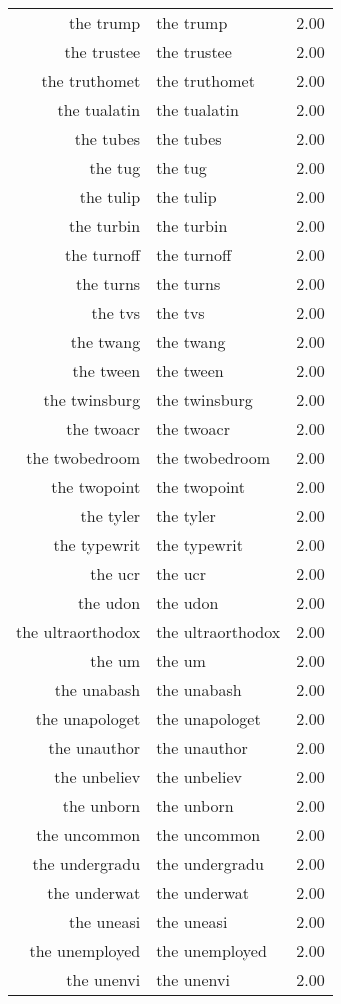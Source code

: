 \begin{table}[ht]
\begin{tabular}{rlr}
  the trump & the trump & 2.00 \\ 
  the trustee & the trustee & 2.00 \\ 
  the truthomet & the truthomet & 2.00 \\ 
  the tualatin & the tualatin & 2.00 \\ 
  the tubes & the tubes & 2.00 \\ 
  the tug & the tug & 2.00 \\ 
  the tulip & the tulip & 2.00 \\ 
  the turbin & the turbin & 2.00 \\ 
  the turnoff & the turnoff & 2.00 \\ 
  the turns & the turns & 2.00 \\ 
  the tvs & the tvs & 2.00 \\ 
  the twang & the twang & 2.00 \\ 
  the tween & the tween & 2.00 \\ 
  the twinsburg & the twinsburg & 2.00 \\ 
  the twoacr & the twoacr & 2.00 \\ 
  the twobedroom & the twobedroom & 2.00 \\ 
  the twopoint & the twopoint & 2.00 \\ 
  the tyler & the tyler & 2.00 \\ 
  the typewrit & the typewrit & 2.00 \\ 
  the ucr & the ucr & 2.00 \\ 
  the udon & the udon & 2.00 \\ 
  the ultraorthodox & the ultraorthodox & 2.00 \\ 
  the um & the um & 2.00 \\ 
  the unabash & the unabash & 2.00 \\ 
  the unapologet & the unapologet & 2.00 \\ 
  the unauthor & the unauthor & 2.00 \\ 
  the unbeliev & the unbeliev & 2.00 \\ 
  the unborn & the unborn & 2.00 \\ 
  the uncommon & the uncommon & 2.00 \\ 
  the undergradu & the undergradu & 2.00 \\ 
  the underwat & the underwat & 2.00 \\ 
  the uneasi & the uneasi & 2.00 \\ 
  the unemployed & the unemployed & 2.00 \\ 
  the unenvi & the unenvi & 2.00 \\ 

\end{tabular}
\end{table}
